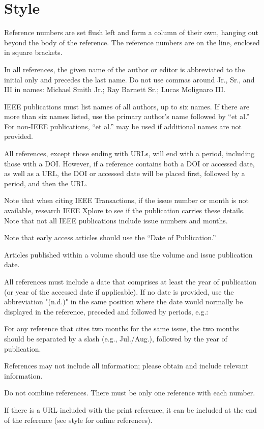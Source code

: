 \documentclass[10pt]{article}
\newcommand*{\guideexample}[1]{\par{\leftskip=22pt \bibentry{#1}\par}}
\begin{document}
\section{Style}
\begin{guideitems}
  \item Reference numbers are set flush left and form a column of their own, hanging out beyond the body of the reference. The reference numbers are on the line, enclosed in square brackets.
  \item In all references, the given name of the author or editor is abbreviated to the initial only and precedes the last name. Do not use commas around Jr., Sr., and III in names: Michael Smith Jr.; Ray Barnett Sr.; Lucas Molignaro III.
  \item IEEE publications must list names of all authors, up to six names. If there are more than six names listed, use the primary author’s name followed by “et al.” For non-IEEE publications, “et al.” may be used if additional names are not provided.
  \item All references, except those ending with URLs, will end with a period, including those with a DOI. However, if a reference contains both a DOI or accessed date, as well as a URL, the DOI or accessed date will be placed first, followed by a period, and then the URL.
  \item Note that when citing IEEE Transactions, if the issue number or month is not available, research IEEE Xplore to see if the publication carries these details. Note that not all IEEE publications include issue numbers and months.
  \item Note that early access articles should use the “Date of Publication.”
  \item Articles published within a volume should use the volume and issue publication date.
  \item All references must include a date that comprises at least the year of publication (or year of the accessed date if applicable). If no date is provided, use the abbreviation "(n.d.)" in the same position where the date would normally be displayed in the reference, preceded and followed by periods, e.g.:
\end{guideitems}
\guideexample{style:nodate}
\begin{guideitems}
  \item For any reference that cites two months for the same issue, the two months should be separated by a slash (e.g., Jul./Aug.), followed by the year of publication.
  \item References may not include all information; please obtain and include relevant information.
  \item Do not combine references. There must be only one reference with each number.
  \item If there is a URL included with the print reference, it can be included at the end of the reference (see style for online references).
\end{guideitems}
\end{document}
